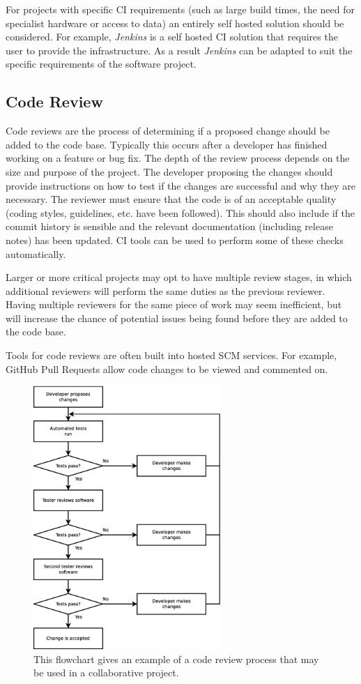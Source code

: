 \documentclass[jnr]{iosart2x}
\begin{document}
For projects with specific CI requirements (such as large build times, the need for specialist hardware or access to data) an entirely self hosted solution should be considered.
For example, {\it Jenkins} \cite{Jenkins} is a self hosted CI solution that requires the user to provide the infrastructure.
As a result {\it Jenkins} can be adapted to suit the specific requirements of the software project.

\subsection{Code Review}
\label{Code review}

Code reviews are the process of determining if a proposed change should be added to the code base.
Typically this occurs after a developer has finished working on a feature or bug fix.
The depth of the review process depends on the size and purpose of the project.
The developer proposing the changes should provide instructions on how to test if the changes are successful and why they are necessary.
The reviewer must ensure that the code is of an acceptable quality (coding styles, guidelines, etc. have been followed).
This should also include if the commit history is sensible and the relevant documentation (including release notes) has been updated.
CI tools can be used to perform some of these checks automatically.

Larger or more critical projects may opt to have multiple review stages, in which additional reviewers will perform the same duties as the previous reviewer.
Having multiple reviewers for the same piece of work may seem inefficient, but will increase the chance of potential issues being found before they are added to the code base.

Tools for code reviews are often built into hosted SCM services.
For example, GitHub Pull Requests allow code changes to be viewed and commented on.

\begin{figure}
    \centering
    \includegraphics[height=10cm]{code_review_process.eps}
    \caption{This flowchart gives an example of a code review process that may be used in a collaborative project.}
    \label{Code_Review_Process}
\end{figure}
\end{document}
